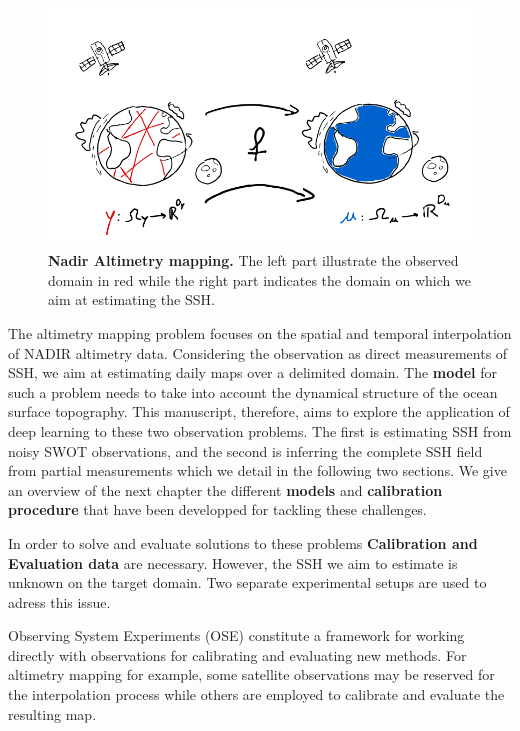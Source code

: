 \begin{bibunit}
\begin{figure}
    \centering
          \includegraphics[width=\linewidth]{Introduction/pics/mapping_task.png}
    \caption{\textbf{Nadir Altimetry mapping.} The left part illustrate the observed domain in red while the right part indicates the domain on which we aim at estimating the SSH.}
    \label{fig:mapping_task}
\end{figure}
The altimetry mapping problem focuses on the spatial and temporal interpolation of NADIR altimetry data. Considering the observation as direct measurements of SSH, we aim at estimating daily maps over a delimited domain. The \textbf{model} for such a problem needs to take into account the dynamical structure of the ocean surface topography.
This manuscript, therefore, aims to explore the application of deep learning to these two observation problems. The first is estimating SSH from noisy SWOT observations, and the second is inferring the complete SSH field from partial measurements which we detail in the following two sections.
We give an overview of the next chapter the different \textbf{models} and \textbf{calibration procedure} that have been developped for tackling these challenges.
  
In order to solve and evaluate solutions to these problems \textbf{Calibration and Evaluation data} are necessary. However, the SSH we aim to estimate is unknown on the target domain.
Two separate experimental setups are used to adress this issue.

Observing System Experiments (OSE) \cite{hamonImpactMultipleAltimeter2019} constitute a framework for working directly with observations for calibrating and evaluating new methods.
For altimetry mapping for example, some satellite observations may be reserved for the interpolation process while others are employed to calibrate and evaluate the resulting map.


\end{bibunit}
